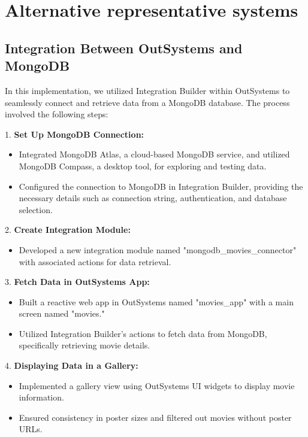 \section{Alternative representative systems}\label{sec:implementation}

   \subsection{Integration Between OutSystems and MongoDB}\label{subsec:outsystems-mongodb}

   In this implementation, we utilized Integration Builder within OutSystems to seamlessly connect and retrieve data from a MongoDB database. The process involved the following steps:

   1. \textbf{Set Up MongoDB Connection:}
      \begin{itemize}
         \item Integrated MongoDB Atlas, a cloud-based MongoDB service, and utilized MongoDB Compass, a desktop tool, for exploring and testing data.
         \item Configured the connection to MongoDB in Integration Builder, providing the necessary details such as connection string, authentication, and database selection.
      \end{itemize}

   2. \textbf{Create Integration Module:}
      \begin{itemize}
         \item Developed a new integration module named "mongodb\_movies\_connector" with associated actions for data retrieval.
      \end{itemize}

   3. \textbf{Fetch Data in OutSystems App:}
      \begin{itemize}
         \item Built a reactive web app in OutSystems named "movies\_app" with a main screen named "movies."
         \item Utilized Integration Builder's actions to fetch data from MongoDB, specifically retrieving movie details.
      \end{itemize}

   4. \textbf{Displaying Data in a Gallery:}
      \begin{itemize}
         \item Implemented a gallery view using OutSystems UI widgets to display movie information.
         \item Ensured consistency in poster sizes and filtered out movies without poster URLs.
      \end{itemize}

